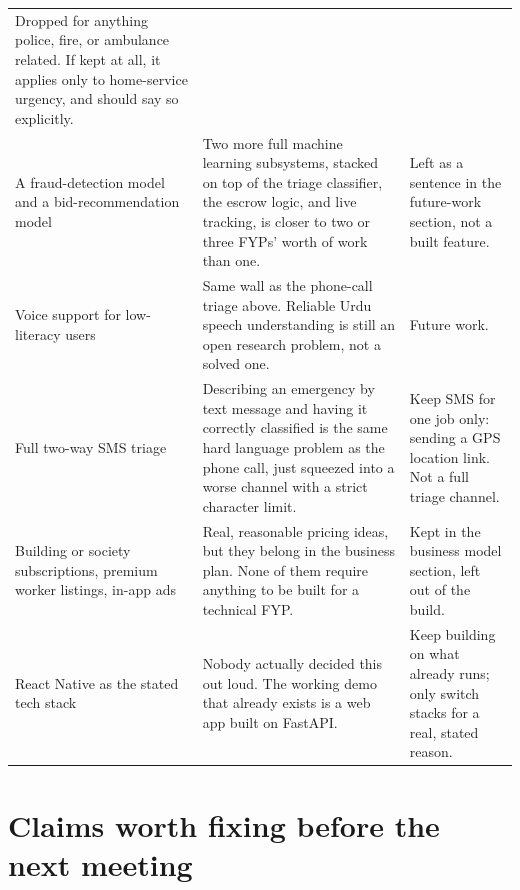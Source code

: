 \documentclass[11pt,a4paper]{article}
\begin{document}
\begin{longtable}{p{} p{} p{}}
Dropped for anything police, fire, or ambulance related. If kept at all, it applies only to home-service urgency, and should say so explicitly. \\
\addlinespace
A fraud-detection model and a bid-recommendation model &
Two more full machine learning subsystems, stacked on top of the triage classifier, the escrow logic, and live tracking, is closer to two or three FYPs' worth of work than one. &
Left as a sentence in the future-work section, not a built feature. \\
\addlinespace
Voice support for low-literacy users &
Same wall as the phone-call triage above. Reliable Urdu speech understanding is still an open research problem, not a solved one. &
Future work. \\
\addlinespace
Full two-way SMS triage &
Describing an emergency by text message and having it correctly classified is the same hard language problem as the phone call, just squeezed into a worse channel with a strict character limit. &
Keep SMS for one job only: sending a GPS location link. Not a full triage channel. \\
\addlinespace
Building or society subscriptions, premium worker listings, in-app ads &
Real, reasonable pricing ideas, but they belong in the business plan. None of them require anything to be built for a technical FYP. &
Kept in the business model section, left out of the build. \\
\addlinespace
React Native as the stated tech stack &
Nobody actually decided this out loud. The working demo that already exists is a web app built on FastAPI. &
Keep building on what already runs; only switch stacks for a real, stated reason. \\
\bottomrule
\end{longtable}

\section{Claims worth fixing before the next meeting}
\end{document}
